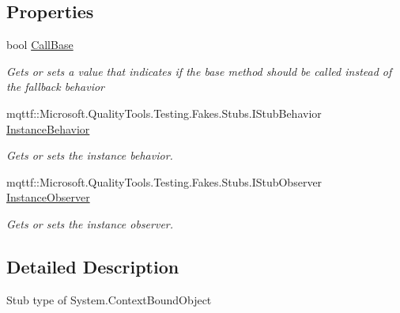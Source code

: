 \subsection*{Properties}
\begin{DoxyCompactItemize}
\item 
bool \hyperlink{class_system_1_1_fakes_1_1_stub_context_bound_object_a7cd9c2b2d3b1d7333ae0326a5ffd439e}{Call\-Base}
\begin{DoxyCompactList}\small\item\em Gets or sets a value that indicates if the base method should be called instead of the fallback behavior\end{DoxyCompactList}\item 
mqttf\-::\-Microsoft.\-Quality\-Tools.\-Testing.\-Fakes.\-Stubs.\-I\-Stub\-Behavior \hyperlink{class_system_1_1_fakes_1_1_stub_context_bound_object_a190b1d6439ece219f14b0ef25ce02110}{Instance\-Behavior}
\begin{DoxyCompactList}\small\item\em Gets or sets the instance behavior.\end{DoxyCompactList}\item 
mqttf\-::\-Microsoft.\-Quality\-Tools.\-Testing.\-Fakes.\-Stubs.\-I\-Stub\-Observer \hyperlink{class_system_1_1_fakes_1_1_stub_context_bound_object_a7c0120dd9e54872aa3bf8dda3b5870f5}{Instance\-Observer}
\begin{DoxyCompactList}\small\item\em Gets or sets the instance observer.\end{DoxyCompactList}\end{DoxyCompactItemize}


\subsection{Detailed Description}
Stub type of System.\-Context\-Bound\-Object



